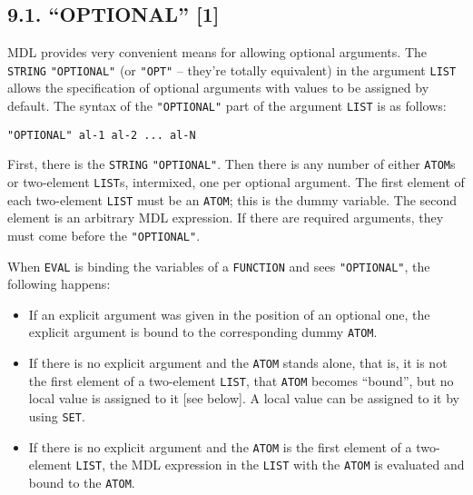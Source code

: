 \documentclass[a4paper,]{article}
\providecommand{\tightlist}{%
  \setlength{\itemsep}{0pt}\setlength{\parskip}{0pt}}
\begin{document}
\subsection{\texorpdfstring{9.1. ``OPTIONAL'' {[}1{]}}{9.1. OPTIONAL {[}1{]}}}\label{optional-1}

MDL provides very convenient means for allowing optional arguments. The \texttt{STRING} \texttt{"OPTIONAL"} (or
\texttt{"OPT"}   -- they're totally equivalent) in the
argument \texttt{LIST} allows the specification of optional arguments with values to be assigned by default. The syntax of
the \texttt{"OPTIONAL"} part of the argument \texttt{LIST} is as follows:

\begin{verbatim}
"OPTIONAL" al-1 al-2 ... al-N
\end{verbatim}

First, there is the \texttt{STRING} \texttt{"OPTIONAL"}. Then there is any number of either \texttt{ATOM}s or two-element
\texttt{LIST}s, intermixed, one per optional argument. The first element of each two-element \texttt{LIST} must be an
\texttt{ATOM}; this is the dummy variable. The second element is an arbitrary MDL expression. If there are required
arguments, they must come before the \texttt{"OPTIONAL"}.

When \texttt{EVAL} is binding the variables of a \texttt{FUNCTION} and sees \texttt{"OPTIONAL"}, the following happens:

\begin{itemize}
\tightlist
\item
  If an explicit argument was given in the position of an optional one, the explicit argument is bound to the corresponding
  dummy \texttt{ATOM}.
\item
  If there is no explicit argument and the \texttt{ATOM} stands alone, that is, it is not the first element of a
  two-element \texttt{LIST}, that \texttt{ATOM} becomes ``bound'', but no local value is assigned to it {[}see below{]}. A
  local value can be assigned to it by using \texttt{SET}.
\item
  If there is no explicit argument and the \texttt{ATOM} is the first element of a two-element \texttt{LIST}, the MDL
  expression in the \texttt{LIST} with the \texttt{ATOM} is evaluated and bound to the \texttt{ATOM}.
\end{itemize}
\end{document}
